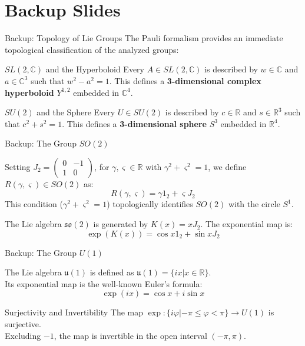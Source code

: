 \section*{Backup Slides}

\begin{frame}{Backup: Topology of Lie Groups}
    The Pauli formalism provides an immediate topological classification of the analyzed groups:
    \vspace{0.3cm}
    \begin{block}{$SL(2,\mathbb{C})$ and the Hyperboloid}
        Every $A \in SL(2,\mathbb{C})$ is described by $w \in \mathbb{C}$ and $a \in \mathbb{C}^3$ such that $w^2 - a^2 = 1$. This defines a \textbf{3-dimensional complex hyperboloid} $Y^{1,2}$ embedded in $\mathbb{C}^4$.
    \end{block}

    \begin{block}{$SU(2)$ and the Sphere}
        Every $U \in SU(2)$ is described by $c \in \mathbb{R}$ and $s \in \mathbb{R}^3$ such that $c^2 + s^2 = 1$. This defines a \textbf{3-dimensional sphere} $S^3$ embedded in $\mathbb{R}^4$.
    \end{block}
\end{frame}

\begin{frame}{Backup: The Group $SO(2)$}
    \begin{definition}[10.3.1]
        Setting $J_2 = \begin{pmatrix} 0 & -1 \\ 1 & 0 \end{pmatrix}$, for $\gamma, \varsigma \in \mathbb{R}$ with $\gamma^2 + \varsigma^2 = 1$, we define $R(\gamma,\varsigma) \in SO(2)$ as:
        \[ R(\gamma,\varsigma) = \gamma 1_2 + \varsigma J_2 \]
        This condition ($\gamma^2 + \varsigma^2 = 1$) topologically identifies $SO(2)$ with the circle $S^1$.
    \end{definition}

    \begin{proposition}[10.3.5]
        The Lie algebra $\mathfrak{so}(2)$ is generated by $K(x) = xJ_2$. The exponential map is:
        \[ \exp(K(x)) = \cos x 1_2 + \sin x J_2 \]
    \end{proposition}
\end{frame}

\begin{frame}{Backup: The Group $U(1)$}
    \begin{proposition}[10.4.1 \& 10.4.2]
        The Lie algebra $\mathfrak{u}(1)$ is defined as $\mathfrak{u}(1) = \{ix | x \in \mathbb{R}\}$.\\
        Its exponential map is the well-known Euler's formula:
        \[ \exp(ix) = \cos x + i \sin x \]
    \end{proposition}
    \begin{block}{Surjectivity and Invertibility}
        The map $\exp : \{ i\varphi | -\pi \leq \varphi < \pi \} \rightarrow U(1)$ is surjective.\\
        Excluding $-1$, the map is invertible in the open interval $(-\pi, \pi)$.
    \end{block}
\end{frame}